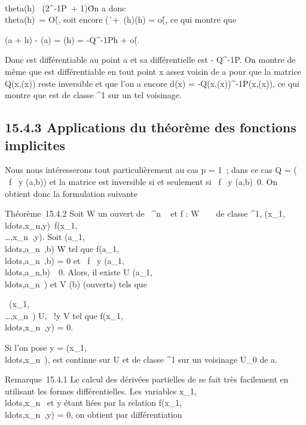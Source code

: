 \documentclass[]{article}
\begin{document}
\\theta(h)\ \leq
(2\Q^-1P\ +
1)\h\.

On a donc \\theta(h)\ =
O(\h\), soit encore
(\h\
+\ \theta(h)\)\eta(h) =
o(\h\), ce qui montre
que

\phi(a + h) - \phi(a) = \theta(h) = -Q^-1Ph +
o(\h\).

Donc \phi est différentiable au point a et sa différentielle est -
Q^-1P. On montre de même que \phi est différentiable en tout
point x assez voisin de a pour que la matrice Q(x,\phi(x)) reste inversible
et que l'on a encore d\phi(x) = -Q(x,\phi(x))^-1P(x,\phi(x)), ce qui
montre que \phi est de classe \mathcal{C}^1 sur un tel voisinage.

\subsection{15.4.3 Applications du théorème des fonctions implicites}

Nous nous intéresserons tout particulièrement au cas p = 1~; dans ce cas
Q = \left (\matrix\, \partial~f
\over \partial~y (a,b)\right ) et la matrice
est inversible si et seulement si  \partial~f \over \partial~y
(a,b)\neq~0. On obtient donc la formulation
suivante

Théorème~15.4.2 Soit W un ouvert de ~^n \times {}~ et f : W \rightarrow~ ~ de
classe \mathcal{C}^1,
(x_1,\\ldots,x_n,y)\mapsto~f(x_1,\\\ldots,x_n~,y).
Soit
(a_1,\\ldots,a_n~,b)
\in W tel que
f(a_1,\\ldots,a_n~,b)
= 0 et  \partial~f \over \partial~y
(a_1,\\ldots,a_n,b)\mathrel\neq~~0.
Alors, il existe U
\inV(a_1,\\ldots,a_n~)
et V \inV(b) (ouverts) tels que

\forall~(x_1,\\\ldots,x_n~)
\in U, \exists~!y \in V \text tel que
f(x_1,\\ldots,x_n~,y)
= 0.

Si l'on pose y =
\phi(x_1,\\ldots,x_n~),
\phi est continue sur U et de classe ^1 sur un voisinage
U_0 de a.

Remarque~15.4.1 Le calcul des dérivées partielles de \phi se fait très
facilement en utilisant les formes différentielles. Les variables
x_1,\\ldots,x_n~
et y étant liées par la relation
f(x_1,\\ldots,x_n~,y)
= 0, on obtient par différentiation
\end{document}
